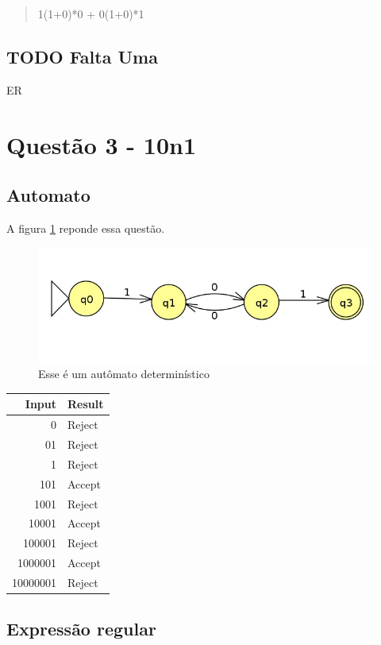 \documentclass[11pt]{article}
\begin{document}
\begin{quote}
1(1+0)*0 + 0(1+0)*1 
\end{quote}

\subsection{{\bfseries\sffamily TODO} Falta Uma}
\label{sec:orgfd0dea1}

ER 

\section{Questão 3 - 10n1}
\label{sec:org28ec68b}
\subsection{Automato}
\label{sec:orgc99ff76}
A figura \ref{fig:org9175d99} reponde essa questão. 

\begin{figure}[htbp]
\centering
\includegraphics[width=.9\linewidth]{./q3/q3.jpg}
\caption{\label{fig:org9175d99}
Esse é um autômato determinístico}
\end{figure}

\begin{center}
\begin{tabular}{rl}
Input & Result\\
\hline
0 & Reject\\
01 & Reject\\
1 & Reject\\
101 & Accept\\
1001 & Reject\\
10001 & Accept\\
100001 & Reject\\
1000001 & Accept\\
10000001 & Reject\\
\end{tabular}
\end{center}
\subsection{Expressão regular}
\label{sec:orgac26965}
\end{document}
